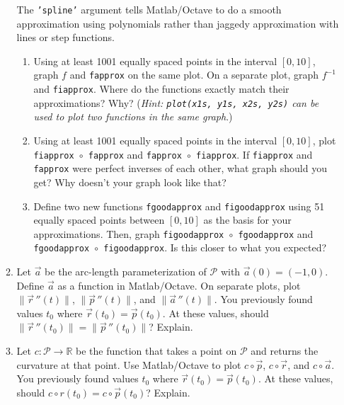 \documentclass[letter]{article}
\newcommand{\R}{\mathbb{R}}
\begin{document}
\begin{enumerate}
\begin{enumerate}
					The {\tt 'spline'} argument tells {\sc Matlab}/{\sc Octave} to do a smooth
					approximation using polynomials
					rather than jaggedy approximation with lines or step functions.

					\begin{enumerate}
						\item Using at least 1001 equally spaced points in the interval $[0,10]$,
							graph $f$ and {\tt fapprox} on the same plot.  On a separate plot,
							graph $f^{-1}$ and {\tt fiapprox}.  Where do the functions
							exactly match their approximations?  Why?  (\emph{Hint: {\tt plot(x1s, y1s, x2s, y2s)}
							can be used to plot two functions in the same graph}.)
						\item Using at least 1001 equally spaced points in the interval $[0,10]$,
							plot {\tt fiapprox $\circ $ fapprox} and {\tt fapprox $\circ$ fiapprox}.
							If {\tt fiapprox} and {\tt fapprox} were perfect inverses of each other,
							what graph should you get?  Why doesn't your graph look like that?
						\item Define two new functions {\tt fgoodapprox} and {\tt figoodapprox}
							using 51 equally spaced points between $[0,10]$ as the basis for your
							approximations.  Then, graph {\tt figoodapprox $\circ $ fgoodapprox}
							and {\tt fgoodapprox $\circ $ figoodapprox}.  Is this closer to what
							you expected?
					\end{enumerate}
				\item Let $\vec a$ be the arc-length parameterization of
					$\mathcal P$ with $\vec a(0) = (-1,0)$.
					Define $\vec a$ as a function in {\sc Matlab}/{\sc Octave}.
					On separate plots, plot $\|\vec r\, ''(t)\|$, $\|\vec p\, ''(t)\|$, and
					$\|\vec a\, ''(t)\|$.  You previously found values $t_0$ where $\vec r(t_0)=\vec p(t_0)$.
					At these values, should $\|\vec r\,''(t_0)\| = \|\vec p\,''(t_0)\|$?  Explain.

				\item Let $c:\mathcal P\to \R$ be the function that takes a point on $\mathcal P$ and
					returns the curvature at that point.  Use {\sc Matlab}/{\sc Octave} to
					plot $c\circ \vec p$, $c\circ \vec r$, and $c\circ \vec a$. 
					You previously found values $t_0$ where $\vec r(t_0)=\vec p(t_0)$.
					At these values, should $c\circ r(t_0) = c\circ \vec p(t_0)$?  Explain.





			\end{enumerate}
	\end{enumerate}
\end{document}
